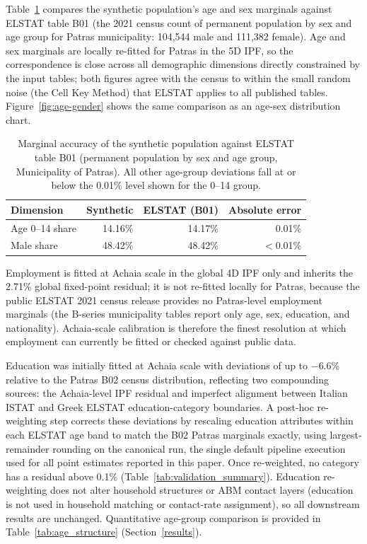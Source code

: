 \documentclass{article}
\begin{document}
Table~\ref{tab:marginal_accuracy} compares the synthetic population's age and sex marginals against ELSTAT table B01 (the 2021 census count of permanent population by sex and age group for Patras municipality: 104,544 male and 111,382 female). Age and sex marginals are locally re-fitted for Patras in the 5D IPF, so the correspondence is close across all demographic dimensions directly constrained by the input tables; both figures agree with the census to within the small random noise (the Cell Key Method) that ELSTAT applies to all published tables. Figure~\ref{fig:age-gender} shows the same comparison as an age-sex distribution chart.

\begin{table}[htbp]
\centering
\small
\begin{tabular}{lrrr}
\toprule
Dimension & Synthetic & ELSTAT (B01) & Absolute error \\
\midrule
Age 0--14 share & 14.16\% & 14.17\% & 0.01\% \\
Male share & 48.42\% & 48.42\% & $<$0.01\% \\
\bottomrule
\end{tabular}
\caption{Marginal accuracy of the synthetic population against ELSTAT table B01 (permanent population by sex and age group, Municipality of Patras). All other age-group deviations fall at or below the 0.01\% level shown for the 0--14 group.}
\label{tab:marginal_accuracy}
\end{table}

Employment is fitted at Achaia scale in the global 4D IPF only and inherits the 2.71\% global fixed-point residual; it is not re-fitted locally for Patras, because the public ELSTAT 2021 census release provides no Patras-level employment marginals (the B-series municipality tables report only age, sex, education, and nationality). Achaia-scale calibration is therefore the finest resolution at which employment can currently be fitted or checked against public data.

Education was initially fitted at Achaia scale with deviations of up to $-$6.6\% relative to the Patras B02 census distribution, reflecting two compounding sources: the Achaia-level IPF residual and imperfect alignment between Italian ISTAT and Greek ELSTAT education-category boundaries. A post-hoc re-weighting step corrects these deviations by rescaling education attributes within each ELSTAT age band to match the B02 Patras marginals exactly, using largest-remainder rounding on the canonical run, the single default pipeline execution used for all point estimates reported in this paper. Once re-weighted, no category has a residual above 0.1\% (Table~\ref{tab:validation_summary}). Education re-weighting does not alter household structures or ABM contact layers (education is not used in household matching or contact-rate assignment), so all downstream results are unchanged. Quantitative age-group comparison is provided in Table~\ref{tab:age_structure} (Section~\ref{results}).
\end{document}
